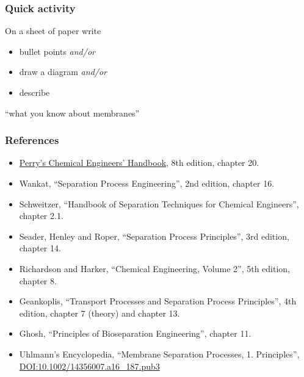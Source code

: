 \begin{frame}\frametitle{Quick activity}
	On a sheet of paper write 
	\begin{itemize}
		\item	bullet points \emph{and/or} 
		\item	draw a diagram \emph{and/or} 
		\item	describe 
	\end{itemize}
	\vspace{12pt}
	``what you know about membranes''
\end{frame}

\begin{frame}\frametitle{References}
	\begin{itemize}
		\item	\href{http://accessengineeringlibrary.com/browse/perrys-chemical-engineers-handbook-eighth-edition}{Perry's Chemical Engineers' Handbook}, 8th edition, chapter 20.
		\item	Wankat, ``Separation Process Engineering'', 2nd edition, chapter 16.
		\item	Schweitzer, ``Handbook of Separation Techniques for Chemical Engineers'', chapter 2.1. %
		\item	Seader, Henley and Roper, ``Separation Process Principles'', 3rd edition, chapter 14.
		\item	Richardson and Harker, ``Chemical Engineering, Volume 2'', 5th edition, chapter 8.
		\item	Geankoplis, ``Transport Processes and Separation Process Principles'', 4th edition, chapter 7 (theory) and chapter 13.
		\item	Ghosh, ``Principles of Bioseparation Engineering'', chapter 11.
		\item	Uhlmann's Encyclopedia, ``Membrane Separation Processes, 1. Principles'',  \href{http://dx.doi.org/10.1002/14356007.a16_187.pub3}{DOI:10.1002/14356007.a16\_187.pub3}
	\end{itemize}
\end{frame}

